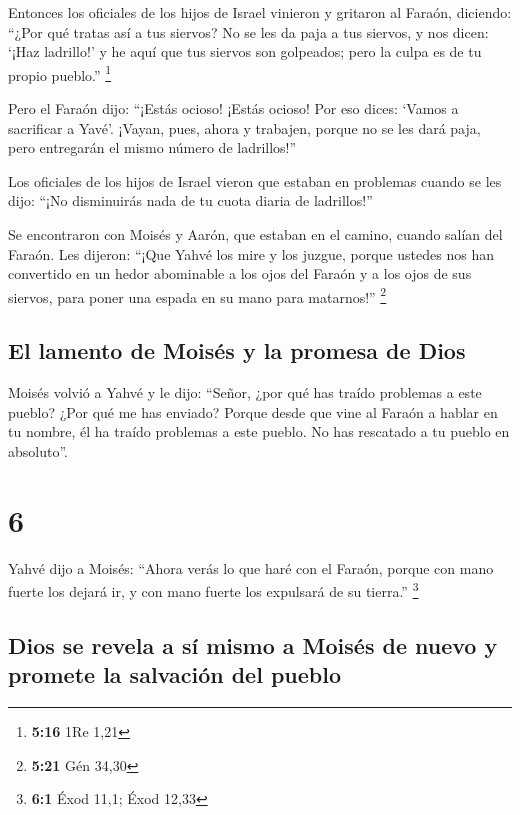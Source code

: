  Entonces los oficiales de los hijos de Israel vinieron y
gritaron al Faraón, diciendo: ``¿Por qué tratas así a tus siervos?
 No se les da paja a tus siervos, y nos dicen: `¡Haz
ladrillo!' y he aquí que tus siervos son golpeados; pero la culpa es de
tu propio pueblo.'' \footnote{\textbf{5:16} 1Re 1,21}

 Pero el Faraón dijo: ``¡Estás ocioso! ¡Estás ocioso! Por
eso dices: `Vamos a sacrificar a Yavé'.  ¡Vayan, pues,
ahora y trabajen, porque no se les dará paja, pero entregarán el mismo
número de ladrillos!''

 Los oficiales de los hijos de Israel vieron que estaban
en problemas cuando se les dijo: ``¡No disminuirás nada de tu cuota
diaria de ladrillos!''

 Se encontraron con Moisés y Aarón, que estaban en el
camino, cuando salían del Faraón.  Les dijeron: ``¡Que
Yahvé los mire y los juzgue, porque ustedes nos han convertido en un
hedor abominable a los ojos del Faraón y a los ojos de sus siervos, para
poner una espada en su mano para matarnos!'' \footnote{\textbf{5:21} Gén
  34,30}

\hypertarget{el-lamento-de-moisuxe9s-y-la-promesa-de-dios}{%
\subsection{El lamento de Moisés y la promesa de
Dios}\label{el-lamento-de-moisuxe9s-y-la-promesa-de-dios}}

 Moisés volvió a Yahvé y le dijo: ``Señor, ¿por qué has
traído problemas a este pueblo? ¿Por qué me has enviado? 
Porque desde que vine al Faraón a hablar en tu nombre, él ha traído
problemas a este pueblo. No has rescatado a tu pueblo en absoluto''.

\hypertarget{section-5}{%
\section{6}\label{section-5}}

 Yahvé dijo a Moisés: ``Ahora verás lo que haré con el
Faraón, porque con mano fuerte los dejará ir, y con mano fuerte los
expulsará de su tierra.'' \footnote{\textbf{6:1} Éxod 11,1; Éxod 12,33}

\hypertarget{dios-se-revela-a-suxed-mismo-a-moisuxe9s-de-nuevo-y-promete-la-salvaciuxf3n-del-pueblo}{%
\subsection{Dios se revela a sí mismo a Moisés de nuevo y promete la
salvación del
pueblo}\label{dios-se-revela-a-suxed-mismo-a-moisuxe9s-de-nuevo-y-promete-la-salvaciuxf3n-del-pueblo}}

